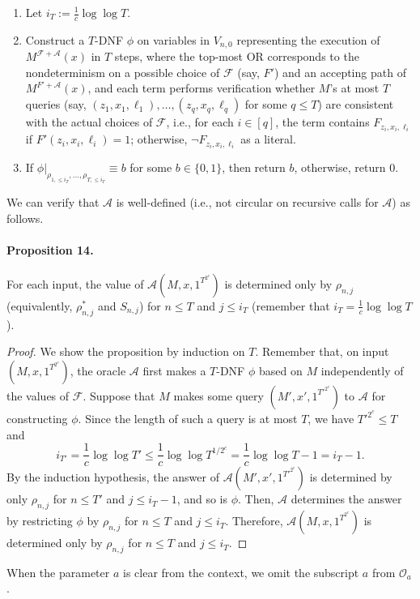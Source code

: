 \documentclass[10pt,a4paper]{article}
\begin{document}
\begin{enumerate}
\begin{enumerate}
\item Let $i_T:=\frac1c\log\log T$.
\item Construct a $T$-DNF $\phi$ on variables in $V_{n,0}$ representing the execution of $M^{\mathcal F+\mathcal A}(x)$ in $T$ steps, where the top-most OR corresponds to the nondeterminism on a possible choice of $\mathcal F$ (say, $F'$) and an accepting path of $M^{F'+\mathcal A}(x)$, and each term performs verification whether $M$'s at most $T$ queries (say, $(z_1,x_1,\ell_1),\ldots,(z_q,x_q,\ell_q)$ for some $q\leq T$) are consistent with the actual choices of $\mathcal F$, i.e., for each $i\in[q]$, the term contains $F_{z_i,x_i,\ell_i}$ if $F'(z_i,x_i,\ell_i)=1$; otherwise, $\neg F_{z_i,x_i,\ell_i}$ as a literal.
\item If $\phi|_{\rho_{1,\leq i_T},\ldots,\rho_{T,\leq i_T}}\equiv b$ for some $b\in\{0,1\}$, then return $b$, otherwise, return 0.
\end{enumerate}
\end{enumerate}
We can verify that $\mathcal A$ is well-defined (i.e., not circular on recursive calls for $\mathcal A$) as follows.
\paragraph{Proposition 14.}
For each input, the value of $\mathcal A(M,x,1^{T^{2^c}})$ is determined only by $\rho_{n,j}$ (equivalently, $\rho^*_{n,j}$ and $S_{n,j}$) for $n\leq T$ and $j\leq i_T$ (remember that $i_T=\frac1c\log\log T$).
\begin{proof}
We show the proposition by induction on $T$. Remember that, on input $(M,x,1^{T^{2^c}})$, the oracle $\mathcal A$ first makes a $T$-DNF $\phi$ based on $M$ independently of the values of $\mathcal F$.
Suppose that $M$ makes some query $(M',x',1^{T'^{2^c}})$ to $\mathcal A$ for constructing $\phi$. Since the length of such a query is at most $T$, we have $T'^{2^c}\leq T$ and
\[i_{T'}=\frac1c\log\log T'\leq\frac1c\log\log T^{1/2^c}=\frac1c\log\log T-1=i_T-1.\]
By the induction hypothesis, the answer of $\mathcal A(M',x',1^{T'^{2^c}})$ is determined by only $\rho_{n,j}$ for $n\leq T'$ and $j\leq i_T-1$, and so is $\phi$. Then, $\mathcal A$ determines the answer by restricting $\phi$ by $\rho_{n,j}$ for $n\leq T$ and $j\leq i_T$. Therefore, $\mathcal A(M,x,1^{T^{2^c}})$ is determined only by $\rho_{n,j}$ for $n\leq T$ and $j\leq i_T$.
\end{proof}
When the parameter $a$ is clear from the context, we omit the subscript $a$ from $\mathcal O_a$.
\end{document}
